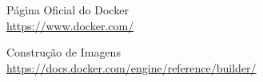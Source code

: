 \documentclass[a4paper,11pt]{article}
\begin{document}


\begin{thebibliography}{5}
  Página Oficial do Docker \\
  \url{https://www.docker.com/}
  
  Construção de Imagens \\
  \url{https://docs.docker.com/engine/reference/builder/}

  
\end{thebibliography}
  
\end{document}
